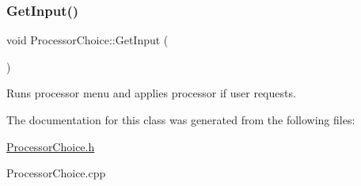 \subsubsection{\texorpdfstring{Get\+Input()}{GetInput()}}
{\footnotesize\ttfamily void Processor\+Choice\+::\+Get\+Input (\begin{DoxyParamCaption}{ }\end{DoxyParamCaption})}

Runs processor menu and applies processor if user requests. 

The documentation for this class was generated from the following files\+:\begin{DoxyCompactItemize}
\item 
\hyperlink{ProcessorChoice_8h}{Processor\+Choice.\+h}\item 
Processor\+Choice.\+cpp\end{DoxyCompactItemize}
